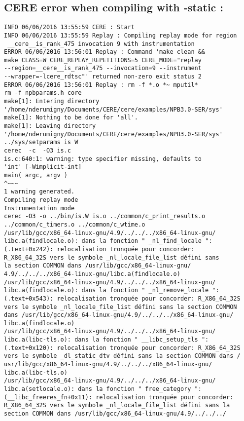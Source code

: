 \documentclass{article}
\begin{document}
\subsection{CERE error when compiling with -static :}
\begin{lstlisting}
INFO 06/06/2016 13:55:59 CERE : Start
INFO 06/06/2016 13:55:59 Replay : Compiling replay mode for region
 __cere__is_rank_475 invocation 9 with instrumentation
ERROR 06/06/2016 13:56:01 Replay : Command 'make clean && 
make CLASS=W CERE_REPLAY_REPETITIONS=5 CERE_MODE="replay 
--region=__cere__is_rank_475 --invocation=9 --instrument 
--wrapper=-lcere_rdtsc"' returned non-zero exit status 2
ERROR 06/06/2016 13:56:01 Replay : rm -f *.o *~ mputil*
rm -f npbparams.h core
make[1]: Entering directory 
'/home/nderumigny/Documents/CERE/cere/examples/NPB3.0-SER/sys'
make[1]: Nothing to be done for 'all'.
make[1]: Leaving directory 
'/home/nderumigny/Documents/CERE/cere/examples/NPB3.0-SER/sys'
../sys/setparams is W
cerec  -c  -O3 is.c
is.c:640:1: warning: type specifier missing, defaults to 
'int' [-Wimplicit-int]
main( argc, argv )
^~~~
1 warning generated.
Compiling replay mode
Instrumentation mode
cerec -O3 -o ../bin/is.W is.o ../common/c_print_results.o 
../common/c_timers.o ../common/c_wtime.o 
/usr/lib/gcc/x86_64-linux-gnu/4.9/../../../x86_64-linux-gnu/
libc.a(findlocale.o): dans la fonction " _nl_find_locale ":
(.text+0x242): relocalisation tronquée pour concorder: 
R_X86_64_32S vers le symbole _nl_locale_file_list défini sans 
la section COMMON dans /usr/lib/gcc/x86_64-linux-gnu/
4.9/../../../x86_64-linux-gnu/libc.a(findlocale.o)
/usr/lib/gcc/x86_64-linux-gnu/4.9/../../../x86_64-linux-gnu/
libc.a(findlocale.o): dans la fonction " _nl_remove_locale ":
(.text+0x543): relocalisation tronquée pour concorder: R_X86_64_32S 
vers le symbole _nl_locale_file_list défini sans la section COMMON 
dans /usr/lib/gcc/x86_64-linux-gnu/4.9/../../../x86_64-linux-gnu/
libc.a(findlocale.o)
/usr/lib/gcc/x86_64-linux-gnu/4.9/../../../x86_64-linux-gnu/
libc.a(libc-tls.o): dans la fonction " __libc_setup_tls ":
(.text+0x120): relocalisation tronquée pour concorder: R_X86_64_32S 
vers le symbole _dl_static_dtv défini sans la section COMMON dans /
usr/lib/gcc/x86_64-linux-gnu/4.9/../../../x86_64-linux-gnu/
libc.a(libc-tls.o)
/usr/lib/gcc/x86_64-linux-gnu/4.9/../../../x86_64-linux-gnu/
libc.a(setlocale.o): dans la fonction " free_category ":
(__libc_freeres_fn+0x11): relocalisation tronquée pour concorder: 
R_X86_64_32S vers le symbole _nl_locale_file_list défini sans la 
section COMMON dans /usr/lib/gcc/x86_64-linux-gnu/4.9/../../../

\end{lstlisting}
\end{document}
